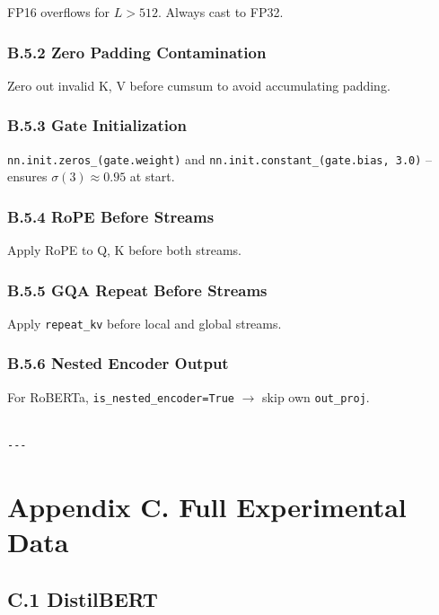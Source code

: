 FP16 overflows for $L > 512$. Always cast to FP32.

\subsubsection{B.5.2 Zero Padding Contamination}

Zero out invalid K, V before cumsum to avoid accumulating padding.

\subsubsection{B.5.3 Gate Initialization}

\texttt{nn.init.zeros\_(gate.weight)} and \texttt{nn.init.constant\_(gate.bias, 3.0)} -- 
ensures $\sigma(3) \approx 0.95$ at start.

\subsubsection{B.5.4 RoPE Before Streams}

Apply RoPE to Q, K before both streams.

\subsubsection{B.5.5 GQA Repeat Before Streams}

Apply \texttt{repeat\_kv} before local and global streams.

\subsubsection{B.5.6 Nested Encoder Output}

For RoBERTa, \texttt{is\_nested\_encoder=True} $\to$ skip own \texttt{out\_proj}.
\begin{lstlisting}

---
\end{lstlisting}


\section{Appendix C. Full Experimental Data}

\subsection{C.1 DistilBERT}

